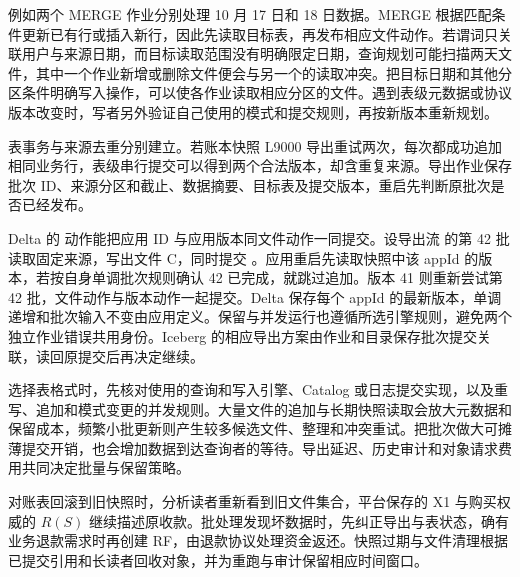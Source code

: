 例如两个 MERGE 作业分别处理 10 月 17 日和 18 日数据。MERGE 根据匹配条件更新已有行或插入新行，因此先读取目标表，再发布相应文件动作。若谓词只关联用户与来源日期，而目标读取范围没有明确限定日期，查询规划可能扫描两天文件，其中一个作业新增或删除文件便会与另一个的读取冲突。把目标日期和其他分区条件明确写入操作，可以使各作业读取相应分区的文件。遇到表级元数据或协议版本改变时，写者另外验证自己使用的模式和提交规则，再按新版本重新规划。

表事务与来源去重分别建立。若账本快照 L9000 导出重试两次，每次都成功追加相同业务行，表级串行提交可以得到两个合法版本，却含重复来源。导出作业保存批次 ID、来源分区和截止、数据摘要、目标表及提交版本，重启先判断原批次是否已经发布。

Delta 的  动作能把应用 ID 与应用版本同文件动作一同提交。设导出流  的第 42 批读取固定来源，写出文件 C，同时提交 。应用重启先读取快照中该 appId 的版本，若按自身单调批次规则确认 42 已完成，就跳过追加。版本 41 则重新尝试第 42 批，文件动作与版本动作一起提交。Delta 保存每个 appId 的最新版本，单调递增和批次输入不变由应用定义。保留与并发运行也遵循所选引擎规则，避免两个独立作业错误共用身份。Iceberg 的相应导出方案由作业和目录保存批次提交关联，读回原提交后再决定继续。

选择表格式时，先核对使用的查询和写入引擎、Catalog 或日志提交实现，以及重写、追加和模式变更的并发规则。大量文件的追加与长期快照读取会放大元数据和保留成本，频繁小批更新则产生较多候选文件、整理和冲突重试。把批次做大可摊薄提交开销，也会增加数据到达查询者的等待。导出延迟、历史审计和对象请求费用共同决定批量与保留策略。

对账表回滚到旧快照时，分析读者重新看到旧文件集合，平台保存的 X1 与购买权威的 $R(S)$ 继续描述原收款。批处理发现坏数据时，先纠正导出与表状态，确有业务退款需求时再创建 RF，由退款协议处理资金返还。快照过期与文件清理根据已提交引用和长读者回收对象，并为重跑与审计保留相应时间窗口。

